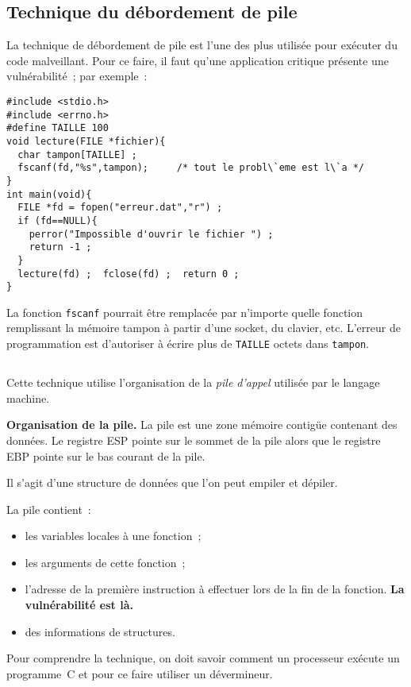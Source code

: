 \begin{frame}
  \section{Technique du d\'ebordement de pile}%
  La technique de d\'ebordement de  pile est l'une des plus utilis\'ee
  pour  ex\'ecuter du code malveillant.  Pour ce  faire, il faut qu'une
  application critique pr\'esente une vuln\'erabilit\'e~; par exemple~:
\begin{verbatim}
#include <stdio.h>
#include <errno.h>
#define TAILLE 100
void lecture(FILE *fichier){
  char tampon[TAILLE] ;
  fscanf(fd,"%s",tampon);     /* tout le probl\`eme est l\`a */
}
int main(void){
  FILE *fd = fopen("erreur.dat","r") ;
  if (fd==NULL){
    perror("Impossible d'ouvrir le fichier ") ;
    return -1 ;
  }
  lecture(fd) ;  fclose(fd) ;  return 0 ;
}
\end{verbatim}
  La   fonction   \texttt{fscanf}   pourrait   \^etre remplac\'ee  par
  n'importe quelle fonction remplissant la m\'emoire tampon \`a partir
  d'une  socket,  du   clavier, etc.  L'erreur    de programmation est
  d'autoriser   \`a   \'ecrire plus   de \texttt{TAILLE}   octets dans
  \texttt{tampon}.
 
\end{frame}
\begin{frame}
  \section{}%
  Cette technique  utilise  l'organisation de  la  \emph{pile d'appel}
  utilis\'ee par le langage machine.
  \par\medskip
  \textbf{Organisation de la pile.}
  La pile est  une zone m\'emoire  contig\"ue contenant des donn\'ees. 
  Le registre   ESP  pointe sur le  sommet   de la pile  alors que  le
  registre EBP pointe sur le bas courant de la pile.
  \par
  Il s'agit   d'une structure de donn\'ees que    l'on peut empiler et
  d\'epiler.
  \par
  La pile contient~:
  \begin{itemize}
  \item les variables locales \`a une fonction~;
  \item les arguments de cette fonction~;
  \item  l'adresse de la premi\`ere  instruction \`a effectuer lors de
    la fin de la fonction. \textbf{La vuln\'erabilit\'e est l\`a.}
  \item des informations de structures.
  \end{itemize}
  \par\medskip
  Pour comprendre la technique,  on doit savoir comment un  processeur
  ex\'ecute un programme~C et pour ce faire utiliser un d\'evermineur.
\end{frame}

